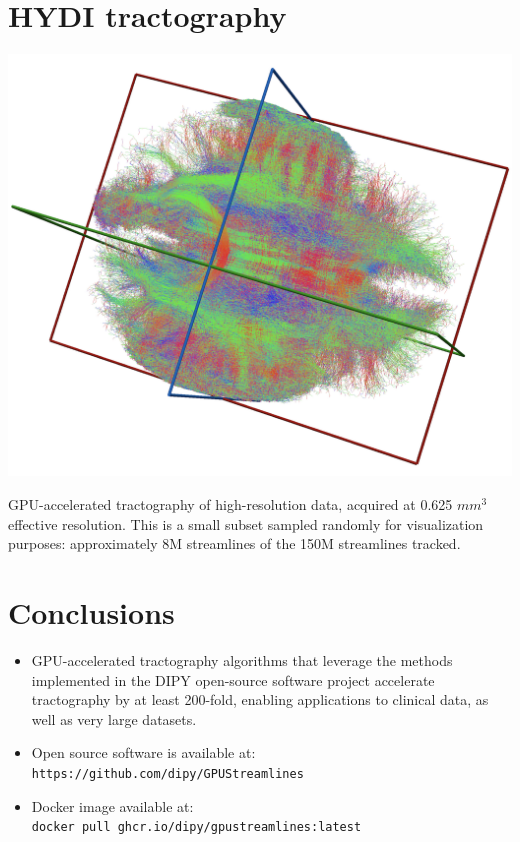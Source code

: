 \documentclass[a0, landscape]{a0poster}
\begin{document}
\begin{multicols}{3}
\section*{HYDI tractography}

\includegraphics[width=0.8\linewidth]{hydi-tractography.png}

GPU-accelerated tractography of high-resolution data, acquired at 0.625 $mm^3$  effective resolution. This is a small subset sampled randomly for visualization purposes: approximately 8M streamlines of the 150M streamlines tracked.


\columnbreak

\color{SaddleBrown} %

\section*{Conclusions}
\large
\begin{itemize}

\item GPU-accelerated tractography algorithms that leverage the methods implemented in the DIPY open-source software project accelerate tractography by at least 200-fold, enabling applications to clinical data, as well as very large datasets.

\item Open source software is available at: \\ \texttt{https://github.com/dipy/GPUStreamlines}

\item Docker image available at: \\ \texttt{docker pull ghcr.io/dipy/gpustreamlines:latest}


\end{itemize}
\end{multicols}
\end{document}
